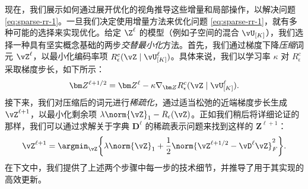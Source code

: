 \documentclass[../../book-main_zh.tex]{subfiles}
\begin{document}
现在，我们展示如何通过展开优化的视角推导这些增量和局部操作，以解决问题 \eqref{eq:sparse-rr-1}。一旦我们决定使用增量方法来优化问题 \eqref{eq:sparse-rr-1}，就有多种可能的选择来实现优化。给定 $\Z^\ell$ 的模型（例如子空间的混合 $\vU_{[K]}$），我们选择一种具有坚实概念基础的两步\textit{交替最小化}方法。首先，我们通过梯度下降\textit{压缩}词元 $\vZ^{\ell}$，以最小化编码率项 $R^c_\epsilon (\vZ \mid \vU_{[K]}^\ell)$。具体来说，我们以学习率 $\kappa$ 对 $R^c_\epsilon$ 采取梯度步长，如下所示：
\begin{align}\label{eq:Z l+1/2}
    \bm Z^{\ell+1/2} = \bm Z^\ell - \kappa \nabla_{\bm Z}
    R^c_\epsilon (\vZ \mid \vU_{[K]}^\ell).
\end{align}
接下来，我们对压缩后的词元进行\textit{稀疏化}，通过适当松弛的近端梯度步长生成 \(\vZ^{\ell + 1}\)，以最小化剩余项 $\lambda \norm{\vZ}_{1} - R_{\epsilon}(\vZ)$。正如我们稍后将详细论证的那样，我们可以通过求解关于字典 $\bm D^\ell$ 的稀疏表示问题来找到这样的 $\bm Z^{\ell+1}$：
\begin{equation}\label{eq:Z l+1}
    \vZ^{\ell+1} = \argmin_{{\vZ}}  \bigg\{\lambda \norm{\vZ}_1 +
    \frac{1}{2}\norm{\vZ^{\ell + 1/2} - \vD^{\ell} {\vZ}}_F^2\bigg\}.
\end{equation}
在下文中，我们提供了上述两个步骤中每一步的技术细节，并推导了用于其实现的高效更新。
\end{document}
